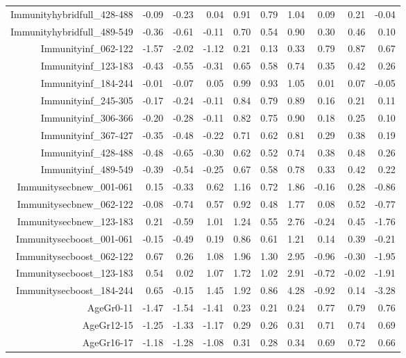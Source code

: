 \begin{table}[ht]
\begin{tabular}{rrrrrrrrrr}
  Immunityhybridfull\_428-488 & -0.09 & -0.23 & 0.04 & 0.91 & 0.79 & 1.04 & 0.09 & 0.21 & -0.04 \\ 
  Immunityhybridfull\_489-549 & -0.36 & -0.61 & -0.11 & 0.70 & 0.54 & 0.90 & 0.30 & 0.46 & 0.10 \\ 
  Immunityinf\_062-122 & -1.57 & -2.02 & -1.12 & 0.21 & 0.13 & 0.33 & 0.79 & 0.87 & 0.67 \\ 
  Immunityinf\_123-183 & -0.43 & -0.55 & -0.31 & 0.65 & 0.58 & 0.74 & 0.35 & 0.42 & 0.26 \\ 
  Immunityinf\_184-244 & -0.01 & -0.07 & 0.05 & 0.99 & 0.93 & 1.05 & 0.01 & 0.07 & -0.05 \\ 
  Immunityinf\_245-305 & -0.17 & -0.24 & -0.11 & 0.84 & 0.79 & 0.89 & 0.16 & 0.21 & 0.11 \\ 
  Immunityinf\_306-366 & -0.20 & -0.28 & -0.11 & 0.82 & 0.75 & 0.90 & 0.18 & 0.25 & 0.10 \\ 
  Immunityinf\_367-427 & -0.35 & -0.48 & -0.22 & 0.71 & 0.62 & 0.81 & 0.29 & 0.38 & 0.19 \\ 
  Immunityinf\_428-488 & -0.48 & -0.65 & -0.30 & 0.62 & 0.52 & 0.74 & 0.38 & 0.48 & 0.26 \\ 
  Immunityinf\_489-549 & -0.39 & -0.54 & -0.25 & 0.67 & 0.58 & 0.78 & 0.33 & 0.42 & 0.22 \\ 
  Immunitysecbnew\_001-061 & 0.15 & -0.33 & 0.62 & 1.16 & 0.72 & 1.86 & -0.16 & 0.28 & -0.86 \\ 
  Immunitysecbnew\_062-122 & -0.08 & -0.74 & 0.57 & 0.92 & 0.48 & 1.77 & 0.08 & 0.52 & -0.77 \\ 
  Immunitysecbnew\_123-183 & 0.21 & -0.59 & 1.01 & 1.24 & 0.55 & 2.76 & -0.24 & 0.45 & -1.76 \\ 
  Immunitysecboost\_001-061 & -0.15 & -0.49 & 0.19 & 0.86 & 0.61 & 1.21 & 0.14 & 0.39 & -0.21 \\ 
  Immunitysecboost\_062-122 & 0.67 & 0.26 & 1.08 & 1.96 & 1.30 & 2.95 & -0.96 & -0.30 & -1.95 \\ 
  Immunitysecboost\_123-183 & 0.54 & 0.02 & 1.07 & 1.72 & 1.02 & 2.91 & -0.72 & -0.02 & -1.91 \\ 
  Immunitysecboost\_184-244 & 0.65 & -0.15 & 1.45 & 1.92 & 0.86 & 4.28 & -0.92 & 0.14 & -3.28 \\ 
  AgeGr0-11 & -1.47 & -1.54 & -1.41 & 0.23 & 0.21 & 0.24 & 0.77 & 0.79 & 0.76 \\ 
  AgeGr12-15 & -1.25 & -1.33 & -1.17 & 0.29 & 0.26 & 0.31 & 0.71 & 0.74 & 0.69 \\ 
  AgeGr16-17 & -1.18 & -1.28 & -1.08 & 0.31 & 0.28 & 0.34 & 0.69 & 0.72 & 0.66 \\ 

\end{tabular}
\end{table}
